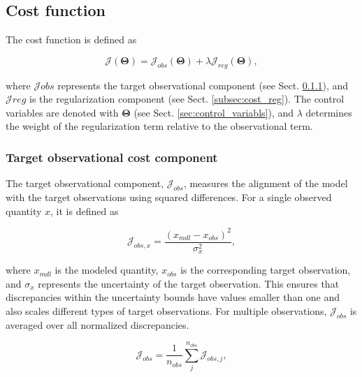 \documentclass[journal abbreviation, manuscript]{copernicus}
\begin{document}
\subsection{Cost function}
\label{sec:cost_function}


The cost function is defined as

\begin{equation}
    \label{eqn:general_cost_function}
    \mathcal{J}(\boldsymbol{\Theta}) = \mathcal{J}_{obs}(\boldsymbol{\Theta}) + \lambda \mathcal{J}_{reg}(\boldsymbol{\Theta}),
\end{equation}

\noindent where $\mathcal{J}{obs}$ represents the target observational component (see Sect. \ref{subsec:cost_obs}), and $\mathcal{J}{reg}$ is the regularization component (see Sect. \ref{subsec:cost_reg}). The control variables are denoted with $\boldsymbol{\Theta}$ (see Sect. \ref{sec:control_variabls}), and $\lambda$ determines the weight of the regularization term relative to the observational term.

\subsubsection{Target observational cost component}
\label{subsec:cost_obs}
The target observational component, $\mathcal{J}_{obs}$, measures the alignment of the model with the target observations using squared differences. For a single observed quantity $x$, it is defined as

\begin{equation}
    \mathcal{J}_{obs,x} = \frac{(x_{mdl} - x_{obs})^2}{\sigma^2_{x}},
\end{equation}

\noindent where $x_{mdl}$ is the modeled quantity, $x_{obs}$ is the corresponding target observation, and $\sigma_x$ represents the uncertainty of the target observation. This ensures that discrepancies within the uncertainty bounds have values smaller than one and also scales different types of target observations. For multiple observations, $\mathcal{J}_{obs}$ is averaged over all normalized discrepancies.

\begin{equation}
\mathcal{J}_{obs} = \frac{1}{n_{obs}} \sum^{n_{obs}}_j \mathcal{J}_{obs,j},
\end{equation}
\end{document}
